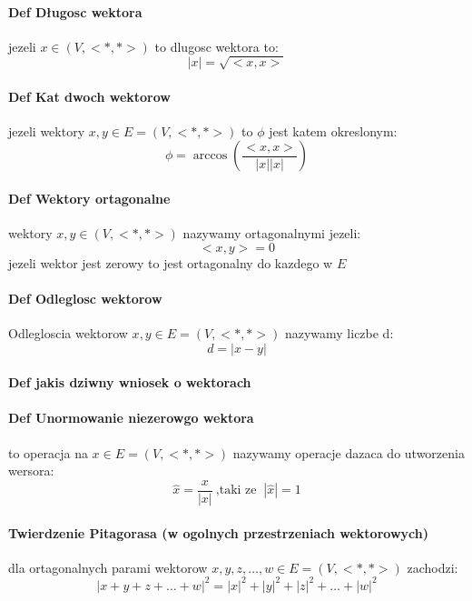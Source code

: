 \documentclass[a4paper]{article}
\begin{document}
\paragraph{Def Długosc wektora} jezeli $x \in (V, <*,*>)$ to dlugosc wektora to:
\begin{equation}
    |x| = \sqrt{<x,x>}
\end{equation}
\paragraph{Def Kat dwoch wektorow} jezeli wektory $x,y \in E = (V,<*,*>)$ to $\phi$ jest katem okreslonym:
\begin{equation}
    \phi = \arccos(\frac{<x,x>}{|x||x|})
\end{equation}
\paragraph{Def Wektory ortagonalne} wektory $ x,y\in (V, <*,*>) $ nazywamy ortagonalnymi jezeli:
\begin{equation}
    <x,y> = 0
\end{equation}
jezeli wektor jest zerowy to jest ortagonalny do kazdego w $E$
\paragraph{Def Odleglosc wektorow}
Odlegloscia wektorow $x,y \in E = (V, <*,*>)$ nazywamy liczbe d:
\begin{equation}
    d = |x -y |
\end{equation}
\paragraph{Def jakis dziwny wniosek o wektorach}
\paragraph{Def Unormowanie niezerowgo wektora} to operacja na $x \in E = (V,<*,*>)$ nazywamy operacje dazaca do utworzenia wersora:
\begin{equation}
    \hat{x} = \frac{x}{|x|} \ \text{,taki ze } \ |\hat{x}| = 1
\end{equation}
\paragraph{Twierdzenie Pitagorasa (w ogolnych przestrzeniach wektorowych)} dla ortagonalnych parami wektorow $x,y,z,\ldots ,w\in E=(V, <*,*>)$ zachodzi:
\begin{equation}
    |x+y+z+\ldots +w|^{2} = |x|^{2} + |y|^{2} + |z|^{2} + \ldots + |w|^{2}
\end{equation}
\end{document}

